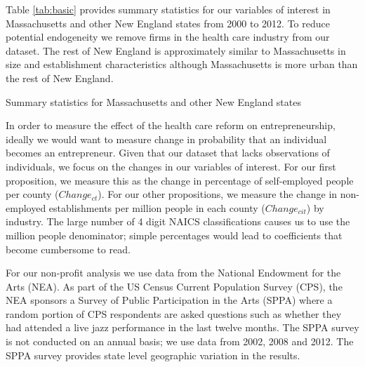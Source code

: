 \documentclass[12pt]{article}
\begin{document}
Table \ref{tab:basic} provides summary statistics for our variables of interest in Massachusetts and other New England states from 2000 to 2012. To reduce potential endogeneity we remove firms in the health care industry from our dataset. The rest of New England is approximately similar to Massachusetts in size and establishment characteristics although Massachusetts is more urban than the rest of New England. 

\begin{table}[H]
	\centering
	\caption{Summary statistics for Massachusetts and other New England states}
	
	\label{tab:basic}
\end{table}

In order to measure the effect of the health care reform on entrepreneurship, ideally we would want to measure change in probability that an individual becomes an entrepreneur. Given that our dataset that lacks observations of individuals, we focus on the changes in our variables of interest. For our first proposition, we measure this as the change in percentage of self-employed people per county ($Change_{ct}$). For our other propositions, we measure the change in non-employed establishments per million people in each county ($Change_{cit}$) by industry. The large number of 4 digit NAICS classifications causes us to use the million people denominator; simple percentages would lead to coefficients that become cumbersome to read. 

For our non-profit analysis we use data from the National Endowment for the Arts (NEA)\nocite{NEA2015}. As part of the US Census Current Population Survey (CPS), the NEA sponsors a Survey of Public Participation in the Arts (SPPA) where a random portion of CPS respondents are asked questions such as whether they had attended a live jazz performance in the last twelve months. The SPPA survey is not conducted on an annual basis; we use data from 2002, 2008 and 2012. The SPPA survey provides state level geographic variation in the results. 
\end{document}
